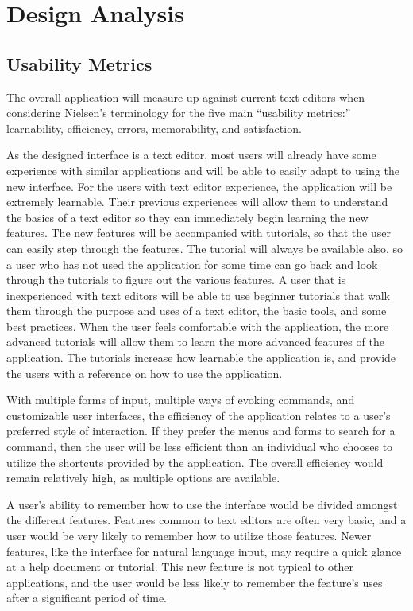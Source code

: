 \documentclass[11pt, oneside]{article}
\begin{document}
\section{Design Analysis}
\subsection{Usability Metrics}
The overall application will measure up against current text editors when considering Nielsen's terminology for the five main ``usability metrics:''  learnability, efficiency, errors, memorability, and satisfaction. 

As the designed interface is a text editor, most users will already have some experience with similar applications and will be able to easily adapt to using the new interface. For the users with text editor experience, the application will be extremely learnable. Their previous experiences will allow them to understand the basics of a text editor so they can immediately begin learning the new features. The new features will be accompanied with tutorials, so that the user can easily step through the features. The tutorial will always be available also, so a user who has not used the application for some time can go back and look through the tutorials to figure out the various features. A user that is inexperienced with text editors will be able to use beginner tutorials that walk them through the purpose and uses of a text editor, the basic tools, and some best practices. When the user feels comfortable with the application, the more advanced tutorials will allow them to learn the more advanced features of the application. The tutorials increase how learnable the application is, and provide the users with a reference on how to use the application.

With multiple forms of input, multiple ways of evoking commands, and customizable user interfaces, the efficiency of the application relates to a user's preferred style of interaction. If they prefer the menus and forms to search for a command, then the user will be less efficient than an individual who chooses to utilize the shortcuts provided by the application. The overall efficiency would remain relatively high, as multiple options are available.

A user's ability to remember how to use the interface would be divided amongst the different features. Features common to text editors are often very basic, and a user would be very likely to remember how to utilize those features. Newer features, like the interface for natural language input, may require a quick glance at a help document or tutorial. This new feature is not typical to other applications, and the user would be less likely to remember the feature's uses after a significant period of time.
\end{document}
